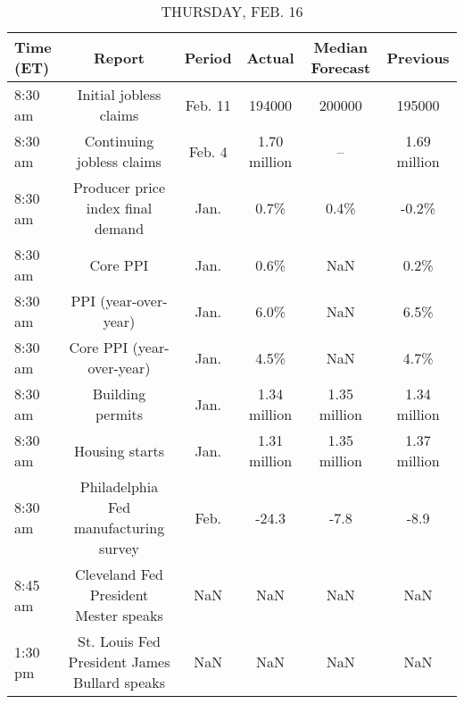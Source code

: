 \documentclass{article}%
\begin{document}
\begin{table}[htbp]%
\caption{THURSDAY, FEB. 16}%
\centering%
\begin{adjustbox}{width=1\textwidth}%
\begin{tabular}{lccccc}
\toprule
Time (ET) &                                       Report &  Period &       Actual & Median Forecast &     Previous \\
\midrule
  8:30 am &                       Initial jobless claims & Feb. 11 &       194000 &          200000 &       195000 \\
  8:30 am &                    Continuing jobless claims &  Feb. 4 & 1.70 million &              -- & 1.69 million \\
  8:30 am &            Producer price index final demand &    Jan. &         0.7\% &            0.4\% &        -0.2\% \\
  8:30 am &                                     Core PPI &    Jan. &         0.6\% &             NaN &         0.2\% \\
  8:30 am &                         PPI (year-over-year) &    Jan. &         6.0\% &             NaN &         6.5\% \\
  8:30 am &                    Core PPI (year-over-year) &    Jan. &         4.5\% &             NaN &         4.7\% \\
  8:30 am &                             Building permits &    Jan. & 1.34 million &    1.35 million & 1.34 million \\
  8:30 am &                               Housing starts &    Jan. & 1.31 million &    1.35 million & 1.37 million \\
  8:30 am &        Philadelphia Fed manufacturing survey &    Feb. &        -24.3 &            -7.8 &         -8.9 \\
  8:45 am &        Cleveland Fed President Mester speaks &     NaN &          NaN &             NaN &          NaN \\
  1:30 pm & St. Louis Fed President James Bullard speaks &     NaN &          NaN &             NaN &          NaN \\
\bottomrule
\end{tabular}
%
\end{adjustbox}%
\end{table}

%
\end{document}
